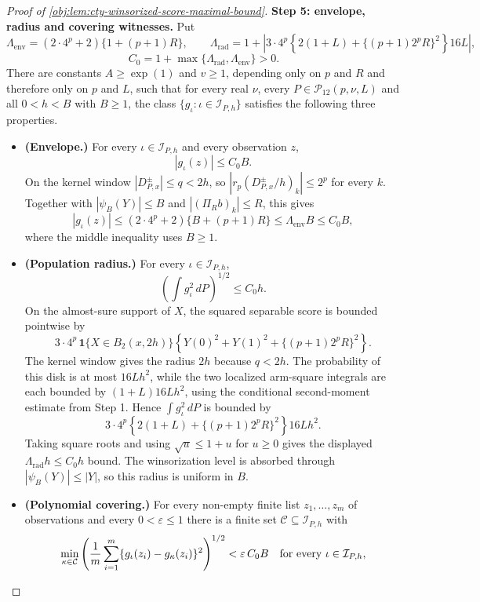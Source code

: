 \documentclass[11pt]{article}
\begin{document}
\begin{proof}[Proof of \cref{obj:lem:cty-winsorized-score-maximal-bound}]
\textbf{Step 5: envelope, radius and covering witnesses.}  Put
\[
\Lambda_{\mathrm{env}}=(2\cdot4^p+2)\{1+(p+1)R\},
\qquad
\Lambda_{\mathrm{rad}}=1+\left|3\cdot4^p\left\{2(1+L)+\{(p+1)2^pR\}^2\right\}16L\right|,
\]
\[
C_0=1+\max\{\Lambda_{\mathrm{rad}},\Lambda_{\mathrm{env}}\}>0 .
\]
There are constants \(A\geq\exp(1)\) and \(v\geq1\), depending only on \(p\) and \(R\) and therefore only on \(p\) and \(L\), such that for every real \(\nu\), every \(P\in\mathcal P_{12}(p,\nu,L)\) and all \(0<h<B\) with \(B\geq1\), the class \(\{g_\iota:\iota\in\mathcal I_{P,h}\}\) satisfies the following three properties.
\begin{itemize}
\item \textbf{(Envelope.)} For every \(\iota\in\mathcal I_{P,h}\) and every observation \(z\),
\[
|g_\iota(z)|\leq C_0B .
\]
On the kernel window \(|D^{\pm}_{P,x}|\leq q<2h\), so \(|r_p(D^{\pm}_{P,x}/h)_k|\leq2^p\) for every \(k\).  Together with \(|\psi_B(Y)|\leq B\) and \(|(\Pi_Rb)_k|\leq R\), this gives
\[
|g_\iota(z)|
\leq
(2\cdot4^p+2)\{B+(p+1)R\}
\leq \Lambda_{\mathrm{env}}B
\leq C_0B,
\]
where the middle inequality uses \(B\geq1\).
\item \textbf{(Population radius.)} For every \(\iota\in\mathcal I_{P,h}\),
\[
\left(\int g_\iota^2\,dP\right)^{1/2}\leq C_0h .
\]
On the almost-sure support of \(X\), the squared separable score is bounded pointwise by
\[
3\cdot4^p\,\mathbf 1\{X\in B_2(x,2h)\}
\left\{Y(0)^2+Y(1)^2+\{(p+1)2^pR\}^2\right\}.
\]
The kernel window gives the radius \(2h\) because \(q<2h\).  The probability of this disk is at most \(16Lh^2\), while the two localized arm-square integrals are each bounded by \((1+L)16Lh^2\), using the conditional second-moment estimate from Step 1.  Hence \(\int g_\iota^2\,dP\) is bounded by
\[
3\cdot4^p\left\{2(1+L)+\{(p+1)2^pR\}^2\right\}16Lh^2.
\]
Taking square roots and using \(\sqrt u\leq 1+u\) for \(u\geq0\) gives the displayed \(\Lambda_{\mathrm{rad}}h\leq C_0h\) bound.  The winsorization level is absorbed through \(|\psi_B(Y)|\leq |Y|\), so this radius is uniform in \(B\).
\item \textbf{(Polynomial covering.)} For every non-empty finite list \(z_1,\ldots,z_m\) of observations and every \(0<\varepsilon\leq1\) there is a finite set \(\mathcal C\subseteq\mathcal I_{P,h}\) with
\[
\min_{\kappa\in\mathcal C}
\left({1\over m}\sum_{i=1}^m\{g_\iota(z_i)-g_\kappa(z_i)\}^2\right)^{1/2}
<\varepsilon\,C_0B
\quad\text{for every }\iota\in\mathcal I_{P,h},
\]

\end{itemize}
\end{proof}
\end{document}
